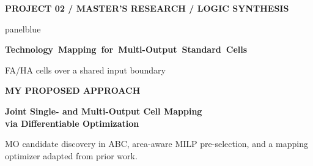 \documentclass[aspectratio=169,10pt]{beamer}
\newcommand{\smalllabel}[1]{{\scriptsize\bfseries\color{Accent}\MakeUppercase{#1}}}
\newcommand{\slidenavigation}{}
\newcommand{\slideposition}{}
\begin{document}
{
\renewcommand{\slidenavigation}{\hyperlink{details-index}{\beamerbutton{Details index}}}
\renewcommand{\slideposition}{Summary 10 / 18}
\begin{frame}[plain,label=summary-10]
  \vfill
  \smalllabel{Project 02 / Master's Research / Logic Synthesis}\par
  \vspace{.40cm}
  \begin{beamercolorbox}[rounded=true,sep=.25cm,wd=\linewidth]{panelblue}
    {\fontsize{13.6}{17}\selectfont\bfseries\color{Ink}
    \mbox{Technology Mapping for Multi-Output Standard Cells}\par}
    \vspace{.14cm}
    {\normalsize\color{Ink}
      FA/HA cells over a shared input boundary\par}
  \end{beamercolorbox}
  \vspace{.80cm}
  \smalllabel{My Proposed Approach}\par
  \vspace{.17cm}
  {\fontsize{18}{23}\selectfont\bfseries\color{Accent}
    Joint Single- and Multi-Output Cell Mapping\\
    via Differentiable Optimization\par}
  \vspace{.18cm}
  {\small\color{Muted}
    MO candidate discovery in ABC, area-aware MILP pre-selection, and a mapping optimizer adapted from prior work.\par}
  \vfill
\end{frame}}
\end{document}
